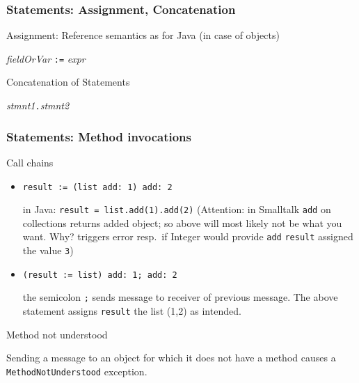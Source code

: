 \documentclass{beamer}
\newcommand{\Blue}[1]{\color{blue}#1\color{black}}
\begin{document}

\begin{frame}[fragile]
\frametitle{Statements: Assignment, Concatenation}

\Blue{Assignment}: Reference semantics as for Java (in case of objects)
\begin{center}
\textit{fieldOrVar} \alert{\texttt{:=}} \textit{expr}
\end{center}

\pause\bigskip

\Blue{Concatenation of Statements}

\begin{center}
\textit{stmnt1}{\huge\alert{\texttt{.}}}\textit{stmnt2}
\end{center}

\end{frame}



\begin{frame}[fragile]
\frametitle{Statements: Method invocations}

\Blue{Call chains}

\begin{itemize}
\item<1->
\begin{lstlisting}[language=Smalltalk]
result := (list add: 1) add: 2
\end{lstlisting} 
in Java: \texttt{result = list.add(1).add(2)} (Attention: in Smalltalk
\texttt{add} on collections returns added object; so above will most
likely not be what you want. Why?  triggers error resp.\ 
if Integer would provide \texttt{add} \texttt{result} assigned the value \texttt{3}) 
\item<2-> 
\begin{lstlisting}[language=Smalltalk]
(result := list) add: 1; add: 2
\end{lstlisting} 
the semicolon \texttt{;} sends message to receiver of previous
message. The above statement assigns \texttt{result} the list (1,2) as intended.

\end{itemize}


\Blue{Method not understood}

Sending a message to an object for which it does not have a method
causes a \texttt{MethodNotUnderstood} exception.


\end{frame}
\end{document}
